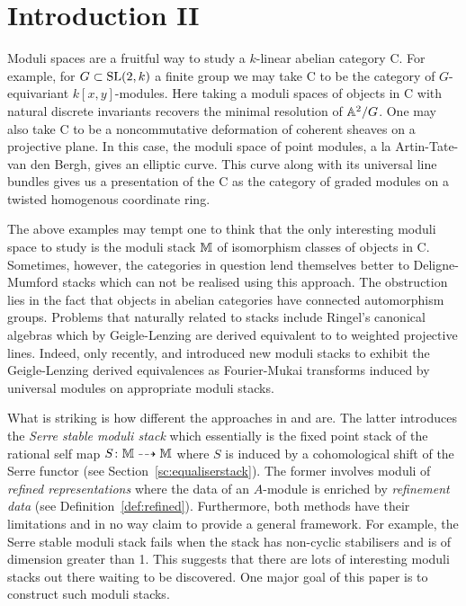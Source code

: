 \documentclass[12pt]{amsart}
\begin{document}
\section{Introduction II}

Moduli spaces are a fruitful way to study a $k$-linear abelian category {\sf C}.
For example, for $G \subset \operatorname{SL}(2,k)$ a finite group we may take {\sf C} to be the category of $G$-equivariant $k[x,y]$-modules. 
Here taking a moduli spaces of objects in {\sf C} with natural discrete invariants recovers the minimal resolution of $\mathbb{A}^2/G$.
One may also take {\sf C} to be a noncommutative deformation of coherent sheaves on a projective plane.
In this case, the moduli space of point modules, a la Artin-Tate-van den Bergh, gives an elliptic curve.
This curve along with its universal line bundles gives us a presentation of the {\sf C} as the category of graded modules on a twisted homogenous coordinate ring.

The above examples may tempt one to think that the only interesting moduli space to study is the moduli stack $\mathbb{M}$ of isomorphism classes of objects in {\sf C}.
Sometimes, however, the categories in question lend themselves better to Deligne-Mumford stacks which can not be realised using this approach.
The obstruction lies in the fact that objects in abelian categories have connected automorphism groups.
Problems that naturally related to stacks include Ringel's canonical algebras which by Geigle-Lenzing \cite{GL} are derived equivalent to to weighted projective lines.
Indeed, only recently, \cite{AU} and \cite{CL} introduced new moduli stacks to exhibit the Geigle-Lenzing derived equivalences as Fourier-Mukai transforms induced by universal modules on appropriate moduli stacks.

What is striking is how different the approaches in \cite{AU} and \cite{CL} are. 
The latter introduces the {\em Serre stable moduli stack} which essentially is the fixed point stack of the rational self map $S\colon \mathbb{M} \dashrightarrow \mathbb{M}$ where $S$ is induced by a cohomological shift of the Serre functor (see Section~\ref{sc:equaliserstack}). 
The former involves moduli of {\em refined representations} where the data of an $A$-module is enriched by {\em refinement data} (see Definition~\ref{def:refined}). 
Furthermore, both methods have their limitations and in no way claim to provide a general framework.
For example, the Serre stable moduli stack fails when the stack has non-cyclic stabilisers and is of dimension greater than 1. 
This suggests that there are lots of interesting moduli stacks out there waiting to be discovered.
One major goal of this paper is to construct such moduli stacks.
\end{document}

